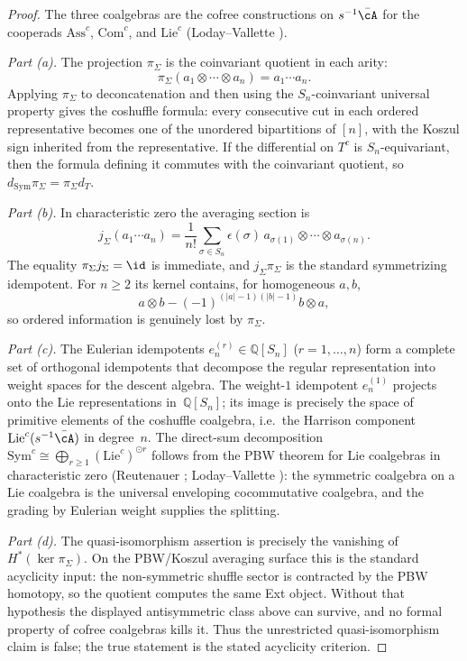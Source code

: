 \begin{proof}
The three coalgebras are the cofree constructions on
$s^{-1}\bar\cA$ for the cooperads
$\mathrm{Ass}^c$, $\mathrm{Com}^c$, and $\mathrm{Lie}^c$
(Loday--Vallette \cite[Theorem~1.3.6,
Proposition~8.6.9]{LV12}).

\emph{Part\/ \textup{(a)}.}
The projection $\pi_\Sigma$ is the
coinvariant quotient in each arity:
\[
\pi_\Sigma(a_1\otimes\cdots\otimes a_n)=a_1\cdots a_n.
\]
Applying $\pi_\Sigma$ to deconcatenation and then using the
$S_n$-coinvariant universal property gives the coshuffle formula:
every consecutive cut in each ordered representative becomes one of
the unordered bipartitions of $[n]$, with the Koszul sign inherited
from the representative. If the differential on $T^c$ is
$S_n$-equivariant, then the formula defining it commutes with the
coinvariant quotient, so
$d_{\mathrm{Sym}}\pi_\Sigma=\pi_\Sigma d_T$.

\emph{Part\/ \textup{(b)}.}
In characteristic zero the averaging section is
\[
j_\Sigma(a_1\cdots a_n)
=\frac{1}{n!}\sum_{\sigma\in S_n}
\epsilon(\sigma)\,
a_{\sigma(1)}\otimes\cdots\otimes a_{\sigma(n)}.
\]
The equality $\pi_\Sigma j_\Sigma=\id$ is immediate, and
$j_\Sigma\pi_\Sigma$ is the standard symmetrizing idempotent. For
$n\ge2$ its kernel contains, for homogeneous $a,b$,
\[
a\otimes b-(-1)^{(|a|-1)(|b|-1)}b\otimes a,
\]
so ordered information is genuinely lost by $\pi_\Sigma$.

\emph{Part\/ \textup{(c)}.}
The Eulerian idempotents
$e^{(r)}_n \in \mathbb{Q}[S_n]$
($r = 1, \ldots, n$) form a complete set of
orthogonal idempotents that decompose the regular
representation into weight spaces for the
descent algebra. The weight-$1$ idempotent
$e^{(1)}_n$ projects onto the Lie representations
in~$\mathbb{Q}[S_n]$; its image is precisely the
space of primitive elements of the coshuffle
coalgebra, i.e.\ the Harrison component
$\mathrm{Lie}^c(s^{-1}\bar\cA)$ in degree~$n$.
The direct-sum decomposition
$\mathrm{Sym}^c \cong \bigoplus_{r \ge 1}
(\mathrm{Lie}^c)^{\odot r}$ follows from the
PBW theorem for Lie coalgebras in characteristic zero
(Reutenauer \cite[Chapter~9]{Reutenauer93};
Loday--Vallette \cite[\S1.3.4]{LV12}):
the symmetric coalgebra on a Lie coalgebra is the
universal enveloping cocommutative coalgebra, and the
grading by Eulerian weight supplies the splitting.

\emph{Part\/ \textup{(d)}.}
The quasi-isomorphism assertion is precisely the vanishing of
$H^*(\ker\pi_\Sigma)$. On the PBW/Koszul averaging surface this is the
standard acyclicity input: the non-symmetric shuffle sector is
contracted by the PBW homotopy, so the quotient computes the same
Ext object. Without that hypothesis the displayed antisymmetric class
above can survive, and no formal property of cofree coalgebras kills
it. Thus the unrestricted quasi-isomorphism claim is false; the true
statement is the stated acyclicity criterion.


\end{proof}
